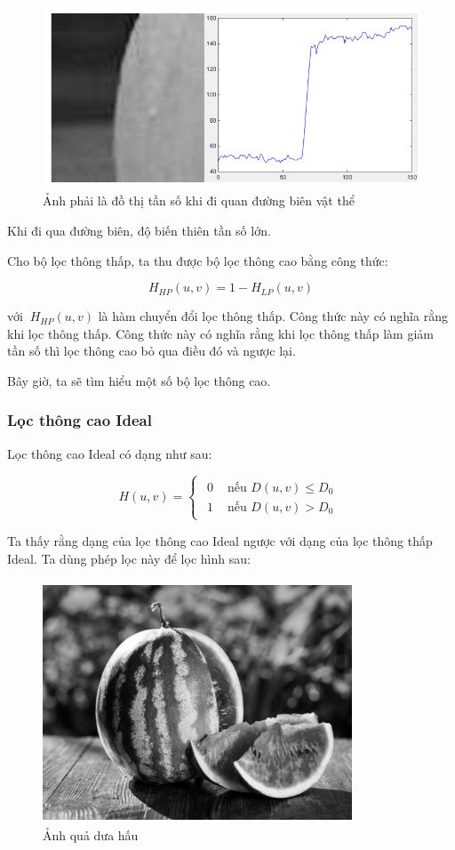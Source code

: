 \documentclass[12pt,a4paper]{report}
\numberwithin{equation}{section}
\theoremstyle{definition} %
\begin{document}
\begin{figure}[H]
\centering
\includegraphics[width=0.88\linewidth]{img/lamsacanh1.png}
\caption{Ảnh phải là đồ thị tần số khi đi quan đường biên vật thể}
\end{figure}


Khi đi qua đường biên, độ biến thiên tần số lớn.

Cho bộ lọc thông thấp, ta thu được bộ lọc thông cao bằng công thức:

\begin{equation}
  H_{HP}(u,v) = 1 -   H_{LP}(u,v)
\end{equation}

với $\  H_{HP}(u,v)$ là hàm chuyển đổi lọc thông thấp. Công thức này có nghĩa rằng khi lọc thông thấp. Công thức này có nghĩa rằng khi lọc thông thấp làm giảm tần số thì lọc thông cao bỏ qua điều đó và ngược lại.

Bây giờ, ta sẽ tìm hiểu một số bộ lọc thông cao.

\subsubsection{Lọc thông cao Ideal}

Lọc thông cao Ideal có dạng như sau:

\begin{equation}
      H(u,v)=\begin{cases}
    \begin{aligned}
        0& \text{ nếu }  D(u,v) \le D_0\\
        1& \text{ nếu }  D(u,v) > D_0
    \end{aligned}
\end{cases}
\end{equation}


Ta thấy rằng dạng của lọc thông cao Ideal ngược với dạng của lọc thông thấp Ideal. Ta dùng phép lọc này để lọc hình sau: 
\begin{figure}[H]
\centering
\includegraphics[width=0.5\linewidth]{img/Duahau.png}
\caption{Ảnh quả dưa hấu}
\end{figure}
\end{document}
